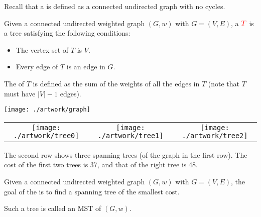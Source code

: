 \documentclass{beamer}
\def\vgap{\vspace{5mm}}
\begin{document}
\begin{frame}
\begin{small}

    \vgap 
    
    Recall that a  is defined as a connected undirected graph with no cycles. 
    
    \vgap 
    
    Given a connected undirected weighted graph $(G, w)$ with $G = (V, E)$, a  $\textcolor{red}{T}$ is a tree satisfying the following conditions: 
    \begin{itemize} 
        \item The vertex set of $T$ is $V$. 
        \item Every edge of $T$ is an edge in $G$. 
    \end{itemize}

    \vgap
    
    The  of $T$ is defined as the sum of the weights of all the edges in $T$ (note that $T$ must have $|V| - 1$ edges). 
\end{small}    
\end{frame}
\begin{frame}
\begin{small}

    \begin{center} 
        \texttt{[image: ./artwork/graph]} \\[2mm] 
        \begin{tabular}{ccc} 
            \texttt{[image: ./artwork/tree0]} &
            \texttt{[image: ./artwork/tree1]} & 
            \texttt{[image: ./artwork/tree2]}
        \end{tabular}

    \end{center}

    The second row shows three spanning trees (of the graph in the first row). The cost of the first two trees is 37, and that of the right tree is 48.
   
\end{small}    
\end{frame}
\begin{frame}
\begin{small}

    \vgap 
    
    Given a connected undirected weighted graph $(G, w)$ with $G = (V, E)$, the goal of the  is to find a spanning tree of the smallest cost. 
    
    \vgap 
    
    Such a tree is called an MST of $(G, w)$. 
\end{small}    
\end{frame}
\end{document}
